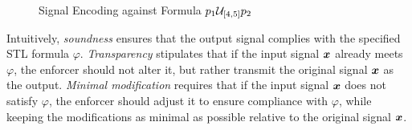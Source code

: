 \begin{figure*}[htbp]
\begin{adjustbox}{max width=1\linewidth}
            \end{adjustbox}
            \caption{Signal Encoding against Formula $p_1\until_{[4,5]}p_2$}
            \label{fig:signal-encoding}
            \end{figure*}
            
    Intuitively, \emph{soundness} ensures that the output signal complies with the specified STL formula $\varphi$. \emph{Transparency} stipulates that if the input signal $\bm{x}$ already meets $\varphi$, the enforcer should not alter it, but rather transmit the original signal $\bm{x}$ as the output. \emph{Minimal modification} requires that if the input signal $\bm{x}$ does not satisfy $\varphi$, the enforcer should adjust it to ensure compliance with $\varphi$, while keeping the modifications as minimal as possible relative to the original signal $\bm{x}$.
    


